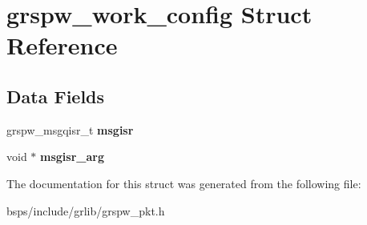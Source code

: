\hypertarget{structgrspw__work__config}{}\section{grspw\+\_\+work\+\_\+config Struct Reference}
\label{structgrspw__work__config}
\subsection*{Data Fields}
\begin{DoxyCompactItemize}
\item 
\mbox{\label{structgrspw__work__config_aead8aa23d8658a2024f99dbcdaec37d5}} 
grspw\+\_\+msgqisr\+\_\+t {\bfseries msgisr}
\item 
\mbox{\label{structgrspw__work__config_a4d69611765741587191803844e5c6e6b}} 
void $\ast$ {\bfseries msgisr\+\_\+arg}
\end{DoxyCompactItemize}


The documentation for this struct was generated from the following file\+:\begin{DoxyCompactItemize}
\item 
bsps/include/grlib/grspw\+\_\+pkt.\+h\end{DoxyCompactItemize}
